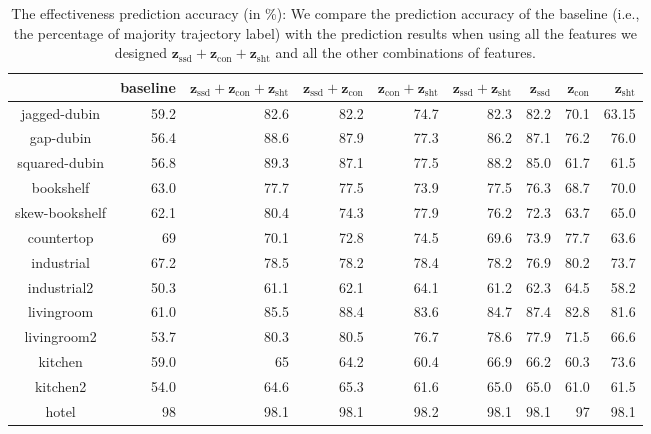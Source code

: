 \documentclass[letterpaper, 10 pt, conference]{ieeeconf}  %
\newcommand{\fssd}{\mbox{$\mathbf z_{\text{ssd}}$}}
\newcommand{\fcon}{\mbox{$\mathbf z_{\text{con}}$}}
\newcommand{\fsht}{\mbox{$\mathbf z_{\text{sht}}$}}
\begin{document}
\begin{table}[tbp]
\centering
\begin{tabular}{|c|r|r|r|r|r|r|r|r|}
\hline 
 & baseline & $\fssd+\fcon+\fsht$ & $\fssd+\fcon$ & $\fcon+\fsht$ & $\fssd+\fsht$ & $\fssd$ & $\fcon$ & $\fsht$ \\ \hline \hline
jagged-dubin & 59.2 & 82.6	& 82.2 & 74.7 & 82.3 & 82.2 & 70.1 & 63.15 \\ \hline
gap-dubin & 56.4 & 88.6 & 87.9 & 77.3 & 86.2 & 87.1 & 76.2 & 76.0 \\ \hline
squared-dubin & 56.8 & 89.3 & 	87.1 & 	77.5 &	88.2 &	85.0 &	 61.7	& 61.5 \\ \hline \hline

bookshelf & 63.0 & 77.7 & 	77.5 &	73.9 &	77.5 &	76.3 &	68.7 & 70.0 \\ \hline
skew-bookshelf & 62.1 & 80.4 &	74.3 & 	77.9 & 	76.2 &	72.3 &	63.7 &	65.0 \\ \hline
countertop & 69 & 70.1	& 72.8 & 	74.5	 & 69.6 & 	73.9 &	77.7 &	63.6 \\ \hline
industrial & 67.2 & 78.5 &	78.2 &	78.4 &	78.2 &	76.9 &	80.2 & 	73.7 \\ \hline
industrial2 & 50.3 & 61.1 & 	62.1	 & 64.1 &	61.2 & 	62.3 & 	64.5 &	58.2 \\ \hline \hline

livingroom & 61.0 & 85.5	& 88.4 &	 83.6 &	84.7 &	87.4 & 	82.8 &	81.6 \\ \hline
livingroom2 & 53.7 & 80.3 &	 80.5	& 76.7 &	 78.6 &	77.9 & 	71.5 & 	66.6 \\ \hline
kitchen & 59.0 & 65 & 	64.2 & 	60.4 &	66.9 & 	66.2 & 	60.3 & 	73.6 \\ \hline
kitchen2 & 54.0 & 64.6 &	65.3 & 	61.6 & 	65.0 & 	65.0 & 	61.0 &	61.5 \\ \hline
hotel & 98 & 98.1 &	98.1 & 	98.2 &	98.1 &	98.1 &	97	& 98.1 \\ \hline
\end{tabular}
\caption{The effectiveness prediction accuracy (in \%): We compare the prediction accuracy of the baseline (i.e., the percentage of majority trajectory label) with the prediction results when using all the features we designed $\fssd+\fcon+\fsht$ and all the other combinations of features.}
\label{tab:result}
\end{table}
\end{document}
